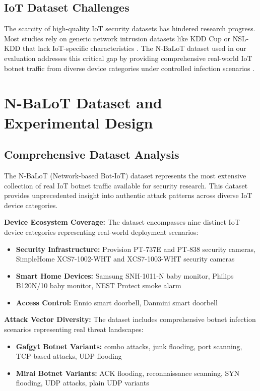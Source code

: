 \documentclass[conference]{IEEEtran}
\begin{document}
\subsection{IoT Dataset Challenges}

The scarcity of high-quality IoT security datasets has hindered research progress. Most studies rely on generic network intrusion datasets like KDD Cup or NSL-KDD that lack IoT-specific characteristics \cite{dataset_survey_2022}. The N-BaLoT dataset used in our evaluation addresses this critical gap by providing comprehensive real-world IoT botnet traffic from diverse device categories under controlled infection scenarios \cite{nbalot_dataset_2018}.

\section{N-BaLoT Dataset and Experimental Design}

\subsection{Comprehensive Dataset Analysis}

The N-BaLoT (Network-based Bot-IoT) dataset represents the most extensive collection of real IoT botnet traffic available for security research. This dataset provides unprecedented insight into authentic attack patterns across diverse IoT device categories.

\textbf{Device Ecosystem Coverage:}
The dataset encompasses nine distinct IoT device categories representing real-world deployment scenarios:
\begin{itemize}
\item \textbf{Security Infrastructure:} Provision PT-737E and PT-838 security cameras, SimpleHome XCS7-1002-WHT and XCS7-1003-WHT security cameras
\item \textbf{Smart Home Devices:} Samsung SNH-1011-N baby monitor, Philips B120N/10 baby monitor, NEST Protect smoke alarm
\item \textbf{Access Control:} Ennio smart doorbell, Danmini smart doorbell
\end{itemize}

\textbf{Attack Vector Diversity:}
The dataset includes comprehensive botnet infection scenarios representing real threat landscapes:
\begin{itemize}
\item \textbf{Gafgyt Botnet Variants:} combo attacks, junk flooding, port scanning, TCP-based attacks, UDP flooding
\item \textbf{Mirai Botnet Variants:} ACK flooding, reconnaissance scanning, SYN flooding, UDP attacks, plain UDP variants
\end{itemize}
\end{document}
